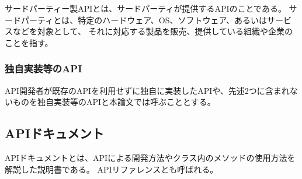 サードパーティー製APIとは、サードパーティが提供するAPIのことである。
サードパーティとは、特定のハードウェア、OS、ソフトウェア、あるいはサービスなどを対象として、
それに対応する製品を販売、提供している組織や企業のことを指す。

\subsubsection {独自実装等のAPI}
API開発者が既存のAPIを利用せずに独自に実装したAPIや、先述2つに含まれないものを独自実装等のAPIと本論文では呼ぶこととする。

\fi

\subsection{APIドキュメント}
APIドキュメントとは、APIによる開発方法やクラス内のメソッドの使用方法を解説した説明書である。
APIリファレンス\cite{API_reference}とも呼ばれる。




























